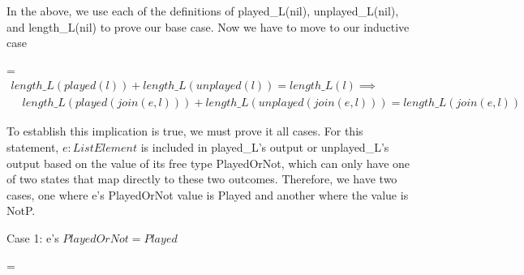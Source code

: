 \documentclass[a4paper,10pt,fleqn]{article}
\begin{document}
\noindent In the above, we use each of the definitions of played\_L(nil), unplayed\_L(nil), and length\_L(nil) to prove our base case.  Now we have to move to our inductive case 

\bigskip

\savedleftskip=\leftskip
\noindent
$\displaystyle
\begin{array}{l}
length\_L(played(l)) + length\_L(unplayed(l)) = length\_L(l) \implies \\
\quad length\_L(played(join(e, l))) + length\_L(unplayed(join(e, l))) = length\_L(join(e, l))
\end{array}$

\bigskip

\noindent To establish this implication is true, we must prove it all cases. For this statement, $e : ListElement$ is included in played\_L's output or unplayed\_L's output based on the value of its free type PlayedOrNot, which can only have one of two states that map directly to these two outcomes.  Therefore, we have two cases, one where e's PlayedOrNot value is Played and another where the value is NotP.

\bigskip

\newpage

\noindent Case 1: e's $PlayedOrNot = Played$

\bigskip

\savedleftskip=\leftskip
\noindent
{}
\bigskip
\end{document}
